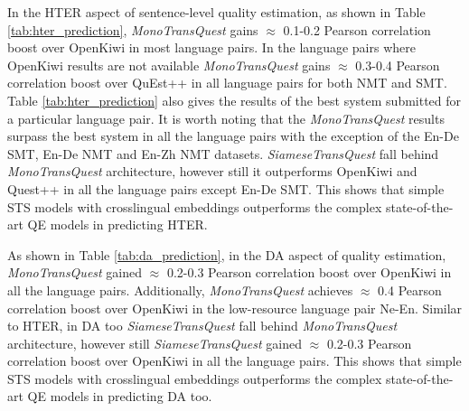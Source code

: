 In the HTER aspect of sentence-level quality estimation, as shown in Table \ref{tab:hter_prediction}, \textit{MonoTransQuest} gains $\approx$ 0.1-0.2 Pearson correlation boost over OpenKiwi in most language pairs. In the language pairs where OpenKiwi results are not available \textit{MonoTransQuest} gains $\approx$ 0.3-0.4 Pearson correlation boost over QuEst++ in all language pairs for both NMT and SMT. Table \ref{tab:hter_prediction}  also gives the results of the best system submitted for a particular language pair. It is worth noting that the \textit{MonoTransQuest} results surpass the best system in all the language pairs with the exception of the En-De SMT, En-De NMT and En-Zh NMT datasets. \textit{SiameseTransQuest} fall behind \textit{MonoTransQuest} architecture, however still it outperforms OpenKiwi and Quest++ in all the language pairs except En-De SMT. This shows that simple STS models with crosslingual embeddings outperforms the complex state-of-the-art QE models in predicting HTER. 


As shown in Table \ref{tab:da_prediction}, in the DA aspect of quality estimation, \textit{MonoTransQuest}  gained $\approx$ 0.2-0.3 Pearson correlation boost over OpenKiwi in all the language pairs. Additionally, \textit{MonoTransQuest} achieves $\approx$ 0.4 Pearson correlation boost over OpenKiwi in the low-resource language pair Ne-En. Similar to HTER, in DA too \textit{SiameseTransQuest} fall behind \textit{MonoTransQuest} architecture, however still \textit{SiameseTransQuest} 
gained $\approx$ 0.2-0.3 Pearson correlation boost over OpenKiwi in all the language pairs. This shows that simple STS models with crosslingual embeddings outperforms the complex state-of-the-art QE models in predicting DA too.


